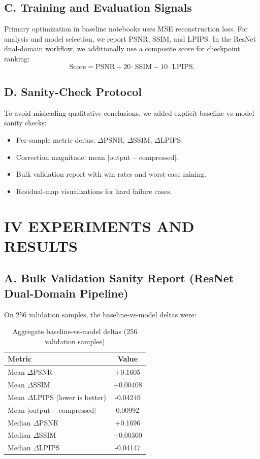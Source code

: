 \documentclass[12pt]{article}
\begin{document}
\subsection*{C. Training and Evaluation Signals}

Primary optimization in baseline notebooks uses MSE reconstruction loss. For analysis and model selection, we report PSNR, SSIM, and LPIPS. In the ResNet dual-domain workflow, we additionally use a composite score for checkpoint ranking:
\begin{equation}
\text{Score} = \text{PSNR} + 20\cdot\text{SSIM} - 10\cdot\text{LPIPS}.
\end{equation}

\subsection*{D. Sanity-Check Protocol}

To avoid misleading qualitative conclusions, we added explicit baseline-vs-model sanity checks:
\begin{itemize}
    \item Per-sample metric deltas: $\Delta$PSNR, $\Delta$SSIM, $\Delta$LPIPS.
    \item Correction magnitude: mean $|\text{output} - \text{compressed}|$.
    \item Bulk validation report with win rates and worst-case mining.
    \item Residual-map visualizations for hard failure cases.
\end{itemize}

\section*{{\large IV}\small{ EXPERIMENTS AND RESULTS}}

\subsection*{A. Bulk Validation Sanity Report (ResNet Dual-Domain Pipeline)}

On 256 validation samples, the baseline-vs-model deltas were:

\begin{table}[H]
\centering
\caption{Aggregate baseline-vs-model deltas (256 validation samples)}
\begin{tabular}{l c}
\toprule
Metric & Value \\
\midrule
Mean $\Delta$PSNR & +0.1605 \\
Mean $\Delta$SSIM & +0.00408 \\
Mean $\Delta$LPIPS (lower is better) & -0.04249 \\
Mean $|\text{output} - \text{compressed}|$ & 0.00992 \\
\midrule
Median $\Delta$PSNR & +0.1696 \\
Median $\Delta$SSIM & +0.00360 \\
Median $\Delta$LPIPS & -0.04147 \\
\bottomrule
\end{tabular}
\end{table}
\end{document}
